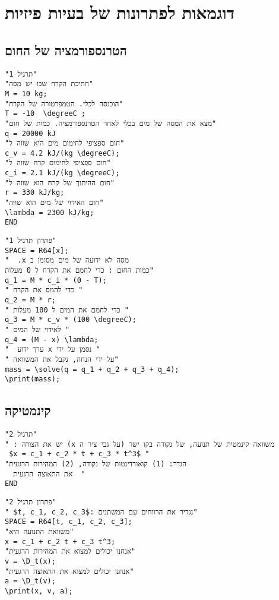 
\chapter{ דוגמאות לפתרונות של בעיות פיזיות  }

\section{הטרנספורמציה של החום}
 
\begin{verbatim}
"תרגיל 1"
"חתיכת הקרח שבו יש מסה"
M = 10 kg;
"הוכנסה לכלי. הטמפרטורה של הקרח"
T = -10  \degreeC ;
"מצא את המסה של מים בכלי לאחר הטרנספורמציה. כמות של חום"
q = 20000 kJ
"חום ספציפי לחימום מים היא שווה ל"
c_v = 4.2 kJ/(kg \degreeC);
"חום ספציפי לחימום קרח שווה ל"
c_i = 2.1 kJ/(kg \degreeC);
"חום ההיתוך של קרח הוא שווה ל"
r = 330 kJ/kg;
"חום האידוי של מים הוא שווה"
\lambda = 2300 kJ/kg;
END
\end{verbatim}

\vspace*{-3mm}

\begin{verbatim}
"פתרון תרגיל 1"
SPACE = R64[x];
"  .x מסה לא ידועה של מים מסומן ב  
כמות החום : כדי לחמם את הקרח ל 0 מעלות"
q_1 = M * c_i * (0 - T);
" כדי להמס את הקרח "
q_2 = M * r;
" כדי לחמם את המים ל 100 מעלות "
q_3 = M * c_v * (100 \degreeC);
" לאידוי של המים "
q_4 = (M - x) \lambda;
"  ערך ידוע x נסמן על ידי "
" על ידי הנחה, נקבל את המשוואה"
mass = \solve(q = q_1 + q_2 + q_3 + q_4); 
\print(mass);
\end{verbatim}

\vspace*{-3mm}

\section{קינמטיקה} 

\begin{verbatim}
"תרגיל 2"
" : יש את הצורה (x משוואה קינמטית של תנועה, של נקודה בקו ישר (על גבי ציר ה  
 $x = c_1 + c_2 * t + c_3 * t^3$ "
"הגדר: (1) קואורדינטות של נקודה, (2) המהירות הרגעית 
  את התאוצה הרגעית  "
END
\end{verbatim}

\vspace*{-3mm}

\begin{verbatim}
"פתרון תרגיל 2"
" $t, c_1, c_2, c_3$: נגדיר את הרווחים עם המשתנים"
SPACE = R64[t, c_1, c_2, c_3];
"משוואת התנועה היא"
x = c_1 + c_2 t + c_3 t^3;
"אנחנו יכולים למצוא את המהירות הרגעית"
v = \D_t(x);
"אנחנו יכולים למצוא את התאוצה הרגעית"
a = \D_t(v);
\print(x, v, a);
\end{verbatim}


